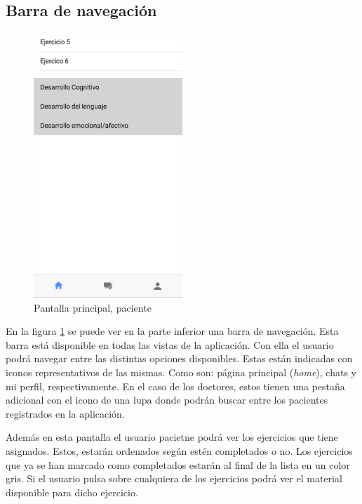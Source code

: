 \subsection{Barra de navegación}
\begin{figure}[!h]
    \centering
    \includegraphics[width=0.5\textwidth]{images/screenshots/Paciente-ventana-principal.png}
    \caption{Pantalla principal, paciente}
    \label{pantalla-principal-paciente}
\end{figure}

En la figura \ref{pantalla-principal-paciente} se puede ver en la parte
inferior una barra de navegación. Esta barra está disponible en todas las
vistas de la aplicación. Con ella el usuario podrá navegar entre las
distintas opciones disponibles. Estas están indicadas con iconos
representativos de las mismas. Como son: página principal (\textit{home}),
chats y mi perfil, respectivamente. En el caso de los doctores, estos tienen
una pestaña adicional con el icono de una lupa donde podrán buscar entre los
pacientes registrados en la aplicación.

Además en esta pantalla el usuario pacietne podrá ver los ejercicios que
tiene asignados. Estos, estarán ordenados según estén completados o no. Los
ejercicios que ya se han marcado como completados estarán al final de la lista
en un color gris. Si el usuario pulsa sobre cualquiera de los ejercicios podrá
ver el material disponible para dicho ejercicio.
\clearpage

